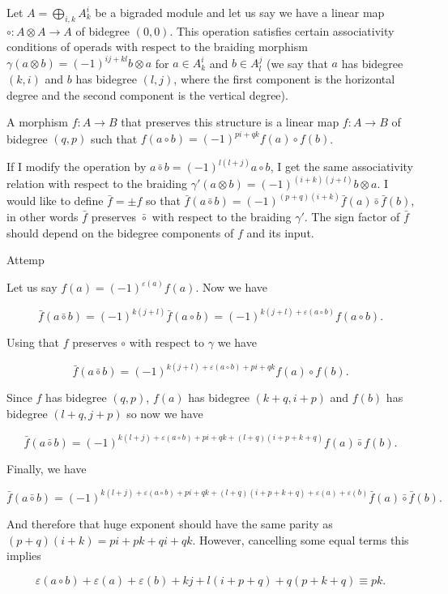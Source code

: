 \documentclass[twoside]{article}
\begin{document}
Let $A=\bigoplus_{i,k} A^i_k$ be a bigraded module and let us say we have a linear map $\circ :A\otimes A\to A$ of bidegree $(0,0)$. This operation satisfies certain associativity conditions of operads with respect to the braiding morphism $\gamma(a\otimes b)=(-1)^{ij+kl}b\otimes a$ for $a\in A^i_k$ and $b\in A^j_l$ (we say that $a$ has bidegree $(k,i)$ and $b$ has bidegree $(l,j)$, where the first component is the horizontal degree and the second component is the vertical degree). 

A morphism $f:A\to B$ that preserves this structure is a linear map $f:A\to B$ of bidegree $(q,p)$ such that $f(a\circ b)=(-1)^{pi+qk}f(a)\circ f(b)$.



If I modify the operation by $a\bar{\circ}b=(-1)^{l(l+j)}a\circ b$, I get the same associativity relation with respect to the braiding $\gamma'(a\otimes b)=(-1)^{(i+k)(j+l)}b\otimes a$. I would like to define $\bar{f}=\pm f$ so that $\bar{f}(a\bar{\circ}b)=(-1)^{(p+q)(i+k)}\bar{f}(a)\bar{\circ}\bar{f}(b)$, in other words $\bar{f}$ preserves $\bar{\circ}$ with respect to the braiding $\gamma'$. The sign factor of $\bar{f}$ should depend on the bidegree components of $f$ and its input.


Attemp

Let us say $f(a)=(-1)^{\varepsilon(a)}f(a)$. Now we have

$$\bar{f}(a\bar{\circ} b)=(-1)^{k(j+l)}\bar{f}(a\circ b)=(-1)^{k(j+l)+\varepsilon(a\circ b)}f(a\circ b).$$

Using that $f$ preserves $\circ$ with respect to $\gamma$ we have

$$\bar{f}(a\bar{\circ} b)=(-1)^{k(j+l)+\varepsilon(a\circ b)+pi+qk}f(a)\circ f(b).$$

Since $f$ has bidegree $(q,p)$, $f(a)$ has bidegree $(k+q,i+p)$ and $f(b)$ has bidegree $(l+q,j+p)$ so now we have

$$\bar{f}(a\bar{\circ} b)=(-1)^{k(l+j)+\varepsilon(a\circ b)+pi+qk+(l+q)(i+p+k+q)}f(a)\bar{\circ} f(b).$$

Finally, we have 

$$\bar{f}(a\bar{\circ} b)=(-1)^{k(l+j)+\varepsilon(a\circ b)+pi+qk+(l+q)(i+p+k+q)+\varepsilon(a)+\varepsilon(b)}\bar{f}(a)\bar{\circ} \bar{f}(b).$$

And therefore that huge exponent should have the same parity as $(p+q)(i+k)=pi+pk+qi+qk$. However, cancelling some equal terms this implies

$$\varepsilon(a\circ b)+\varepsilon(a)+\varepsilon(b)+kj+l(i+p+q)+q(p+k+q)\equiv pk.$$
\end{document}
